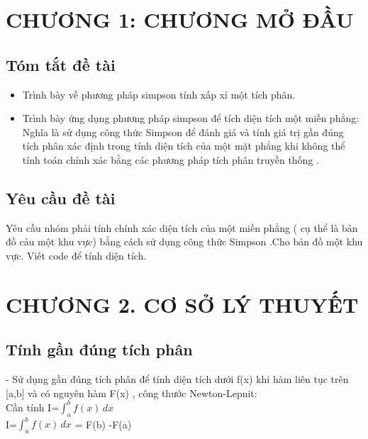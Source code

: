 \documentclass[14pt,a4paper]{article}
\begin{document}
\section*{CHƯƠNG 1: CHƯƠNG MỞ ĐẦU}
\setcounter{section}{1}
\subsection{Tóm tắt đề tài}
\begin{itemize}
\item \fontsize{13pt}{2pt}\selectfont Trình bày về phương pháp simpson tính xấp xỉ một tích phân. \\
\item \fontsize{13pt}{2pt}\selectfont Trình bày ứng dụng phương pháp simpson để tích diện tích một miền phẳng: Nghĩa là sử dụng công thức Simpson để đánh giá và tính giá trị gần đúng tích phân xác định trong tính diện tích của một mặt phẳng khi không thể tính toán chính xác bằng các phương pháp tích phân truyền thống . \\
\end{itemize}
\subsection{Yêu cầu đề tài}
\fontsize{13pt}{2pt}\selectfont           Yêu cầu nhóm phải tính chính xác diện tích của  một miền phẳng ( cụ thể là bản đồ cảu một khu vực) bằng cách sử dụng công thức Simpson .Cho bản đồ một khu vực. Viết code để tính diện tích.\\
\newpage
\section*{CHƯƠNG 2. CƠ SỞ LÝ THUYẾT}
\subsection{Tính gần đúng tích phân}
\fontsize{13pt}{2pt}\selectfont - Sử dụng gần đúng tích phân để tính diện tích dưới f(x) khi hàm liên tục trên [a,b] và có nguyên hàm F(x) , công thước Newton-Lepnit: \\
\hspace*{1cm} \fontsize{13pt}{2pt}\selectfont Cần tính I=${\displaystyle \int_{a}^{b}f(x)\,dx}$\\
\vspace {0.3cm}\hspace*{1cm} \fontsize{13pt}{2pt}\selectfont I=${\displaystyle \int_{a}^{b}f(x)\,dx}$ = F(b) -F(a)\\
\end{document}
